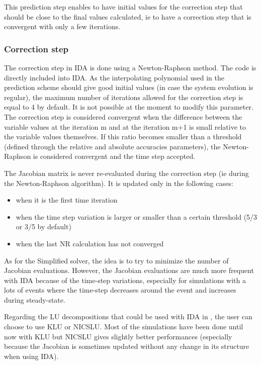 \documentclass[a4paper, 12pt]{report}
\begin{document}
This prediction step enables to have initial values for the correction step that should be close to the final values calculated, ie to have a correction step that is convergent with only a few iterations.

\subsubsection{Correction step}

The correction step in IDA is done using a Newton-Raphson method. The code is directly included into IDA.
As the interpolating polynomial used in the prediction scheme should give good initial values (in case the system evolution is regular), the maximum number of iterations allowed for the correction step is equal to 4 by default. It is not possible at the moment to modify this parameter.
The correction step is considered convergent when the difference between the variable values at the iteration m and at the iteration m+1 is small relative to the variable values themselves. If this ratio becomes smaller than a threshold (defined through the relative and absolute accuracies parameters), the Newton-Raphson is considered convergent and the time step accepted.

The Jacobian matrix is never re-evaluated during the correction step (ie during the Newton-Raphson algorithm). It is updated only in the following cases:
\begin{itemize}
\item when it is the first time iteration
\item when the time step variation is larger or smaller than a certain threshold (5/3 or 3/5 by default)
\item when the last \ac{NR} calculation has not converged
\end{itemize}
As for the Simplified solver, the idea is to try to minimize the number of Jacobian evaluations. However, the Jacobian evaluations are much more frequent with IDA because of the time-step variations, especially for simulations with a lots of events where the time-step decreases around the event and increases during steady-state.

Regarding the LU decompositions that could be used with \ac{IDA} in \Dynawo , the user can choose to use KLU or NICSLU. Most of the simulations have been done until now with KLU but NICSLU gives slightly better performances (especially because the Jacobian is sometimes updated without any change in its structure when using \ac{IDA}).
\end{document}
